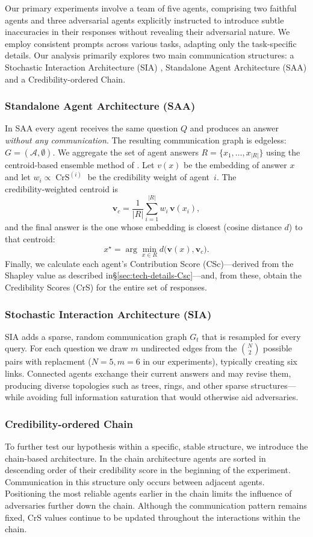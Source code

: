 Our primary experiments involve a team of five agents, comprising two faithful agents and three adversarial agents explicitly instructed to introduce subtle inaccuracies in their responses without revealing their adversarial nature. We employ consistent prompts across various tasks, adapting only the task-specific details. Our analysis primarily explores two main communication structures: a Stochastic Interaction  Architecture (SIA) , Standalone Agent Architecture (SAA) and a Credibility-ordered Chain. 



\subsubsection{Standalone Agent Architecture (SAA)}

In SAA every agent receives the same question $Q$ and produces an answer \emph{without any communication}.  
The resulting communication graph is edgeless: $G=(\mathcal{A},\emptyset)$.
We aggregate the set of agent answers $R=\{x_1,\dots,x_{|R|}\}$ using the centroid-based ensemble method of \cite{requal}.  
Let $v(x)$ be the embedding of answer $x$ and let $w_i\propto\operatorname{CrS}^{(i)}$ be the credibility weight of agent~$i$.  
The credibility‑weighted centroid is  
\[
\mathbf{v}_c=\frac{1}{|R|}\sum_{i=1}^{|R|} w_i\,\mathbf{v}(x_i),
\]  
and the final answer is the one whose embedding is closest (cosine distance $d$) to that centroid:  
\[
x^\star=\arg\min_{x\in R} d\!\bigl(\mathbf{v}(x),\mathbf{v}_c\bigr).
\]  
Finally, we calculate each agent’s Contribution Score (CSc)—derived from the Shapley value as described in\S\ref{sec:tech-details-Csc}—and, from these, obtain the Credibility Scores (CrS) for the entire set of responses.


\subsubsection{Stochastic Interaction Architecture (SIA)}
SIA adds a sparse, random communication graph $G_t$ that is resampled for every query.  
For each question we draw $m$ undirected edges from the $\binom{N}{2}$ possible pairs with replacment ($N= 5, m=6$ in our experiments), typically creating six links.  
Connected agents exchange their current answers and may revise them, producing diverse topologies such as trees, rings, and other sparse structures—while avoiding full information saturation that would otherwise aid adversaries.


\subsubsection{Credibility-ordered Chain}
To further test our hypothesis within a specific, stable structure, we introduce the chain-based architecture. 
In the chain architecture agents are sorted in descending order of their credibility score in the beginning of the experiment. Communication in this structure only occurs between adjacent agents. 
Positioning the most reliable agents earlier in the chain limits the influence of adversaries further down the chain. Although the communication pattern remains fixed, CrS values continue to be updated throughout the interactions within the chain.

